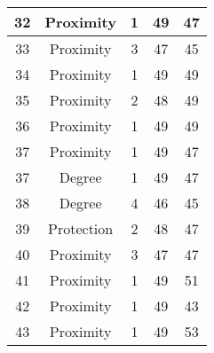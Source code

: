 \documentclass[results.tex]{subfiles}
\begin{document}
\begin{center}
\begin{tabular}{| c || c | c | c | c |}
            \hline
            32                      & Proximity                    & 1                      & 49                      & 47                   \\
            \hline
            33                      & Proximity                    & 3                      & 47                      & 45                   \\
            \hline
            34                      & Proximity                    & 1                      & 49                      & 49                   \\
            \hline
            35                      & Proximity                    & 2                      & 48                      & 49                   \\
            \hline
            36                      & Proximity                    & 1                      & 49                      & 49                   \\
            \hline
            37                      & Proximity                    & 1                      & 49                      & 47                   \\
            \hline
            37                      & Degree                       & 1                      & 49                      & 47                   \\
            \hline
            38                      & Degree                       & 4                      & 46                      & 45                   \\
            \hline
            39                      & Protection                   & 2                      & 48                      & 47                   \\
            \hline
            40                      & Proximity                    & 3                      & 47                      & 47                   \\
            \hline
            41                      & Proximity                    & 1                      & 49                      & 51                   \\
            \hline
            42                      & Proximity                    & 1                      & 49                      & 43                   \\
            \hline
            43                      & Proximity                    & 1                      & 49                      & 53                   \\

\end{tabular}
\end{center}
\end{document}
